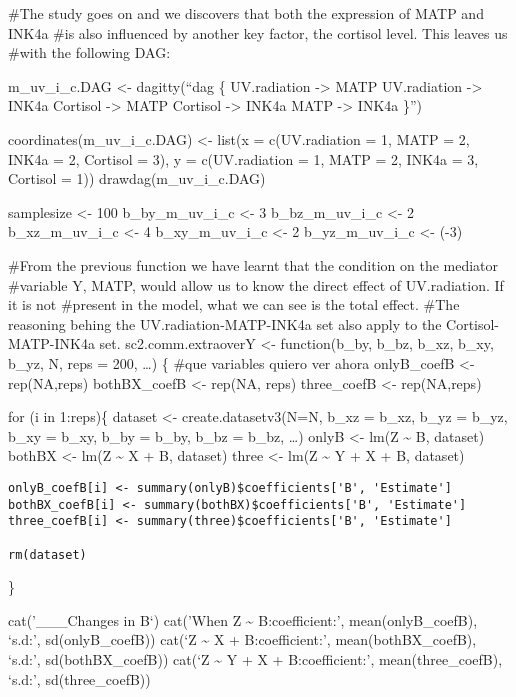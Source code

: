 \documentclass[
]{article}
\begin{document}
\#The study goes on and we discovers that both the expression of MATP
and INK4a \#is also influenced by another key factor, the cortisol
level. This leaves us \#with the following DAG:

m\_uv\_i\_c.DAG \textless- dagitty(``dag \{ UV.radiation -\textgreater{}
MATP UV.radiation -\textgreater{} INK4a Cortisol -\textgreater{} MATP
Cortisol -\textgreater{} INK4a MATP -\textgreater{} INK4a \}'')

coordinates(m\_uv\_i\_c.DAG) \textless- list(x = c(UV.radiation = 1,
MATP = 2, INK4a = 2, Cortisol = 3), y = c(UV.radiation = 1, MATP = 2,
INK4a = 3, Cortisol = 1)) drawdag(m\_uv\_i\_c.DAG)

samplesize \textless- 100 b\_by\_m\_uv\_i\_c \textless- 3
b\_bz\_m\_uv\_i\_c \textless- 2 b\_xz\_m\_uv\_i\_c \textless- 4
b\_xy\_m\_uv\_i\_c \textless- 2 b\_yz\_m\_uv\_i\_c \textless- (-3)

\#From the previous function we have learnt that the condition on the
mediator \#variable Y, MATP, would allow us to know the direct effect of
UV.radiation. If it is not \#present in the model, what we can see is
the total effect. \#The reasoning behing the UV.radiation-MATP-INK4a set
also apply to the Cortisol-MATP-INK4a set. sc2.comm.extraoverY
\textless- function(b\_by, b\_bz, b\_xz, b\_xy, b\_yz, N, reps = 200,
\ldots) \{ \#que variables quiero ver ahora onlyB\_coefB \textless-
rep(NA,reps) bothBX\_coefB \textless- rep(NA, reps) three\_coefB
\textless- rep(NA,reps)

for (i in 1:reps)\{ dataset \textless- create.datasetv3(N=N, b\_xz =
b\_xz, b\_yz = b\_yz, b\_xy = b\_xy, b\_by = b\_by, b\_bz = b\_bz,
\ldots) onlyB \textless- lm(Z \textasciitilde{} B, dataset) bothBX
\textless- lm(Z \textasciitilde{} X + B, dataset) three \textless- lm(Z
\textasciitilde{} Y + X + B, dataset)

\begin{verbatim}
onlyB_coefB[i] <- summary(onlyB)$coefficients['B', 'Estimate']
bothBX_coefB[i] <- summary(bothBX)$coefficients['B', 'Estimate']
three_coefB[i] <- summary(three)$coefficients['B', 'Estimate']

rm(dataset)
\end{verbatim}

\}

cat('\_\_\_Changes in B\n`) cat('When Z \textasciitilde{}
B:\nB coefficient:', mean(onlyB\_coefB), `s.d:', sd(onlyB\_coefB))
cat(`\nWhen Z \textasciitilde{} X + B:\nB coefficient:',
mean(bothBX\_coefB), `s.d:', sd(bothBX\_coefB)) cat(`\nWhen Z
\textasciitilde{} Y + X + B:\nB coefficient:', mean(three\_coefB),
`s.d:', sd(three\_coefB))
\end{document}
